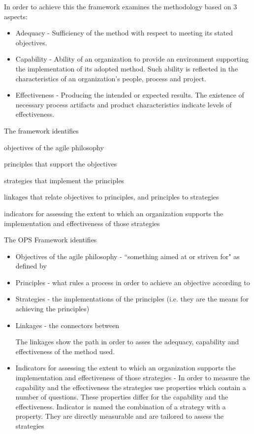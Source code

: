 In order to achieve this the framework examines the methodology based on 3 aspects:
\begin{itemize}
\item Adequacy - Sufficiency of the method with respect to meeting its stated objectives.
\item Capability - Ability of an organization to provide an environment supporting the implementation of its adopted method. Such ability is reflected in the characteristics of an organization's people, process
and project.
\item Effectiveness - Producing the intended or expected results. The existence of necessary process artifacts and product characteristics indicate levels of effectiveness.
\end{itemize}


The framework identifies 
\begin{inparaenum} [a\upshape)]
\item objectives of the agile philosophy
\item principles that support the objectives
\item strategies that implement the principles
\item linkages that relate objectives to
principles, and principles to strategies
\item indicators for assessing the extent to which an organization supports the implementation and effectiveness of those strategies
\end{inparaenum}



The OPS Framework identifies 
\begin{itemize}
\item Objectives of the agile philosophy - ``something aimed at or striven for" as defined by \cite{2604}
\item Principles - what rules a process in order to achieve an objective according to \cite{2604}
\item Strategies - the implementations of the principles (i.e. they are the means for achieving the principles)
\item Linkages - the connectors between 
The linkages show the path in order to asses the adequacy, capability and effectiveness of the method used.
\item Indicators for assessing the extent to which an organization supports the implementation and effectiveness of those strategies - In order to measure the capability and the effectiveness the strategies use properties which contain a number of questions. These properties differ for the capability and the effectiveness. Indicator is named the combination of a strategy with a property. They are directly measurable and are tailored to assess the strategies
\end{itemize}

